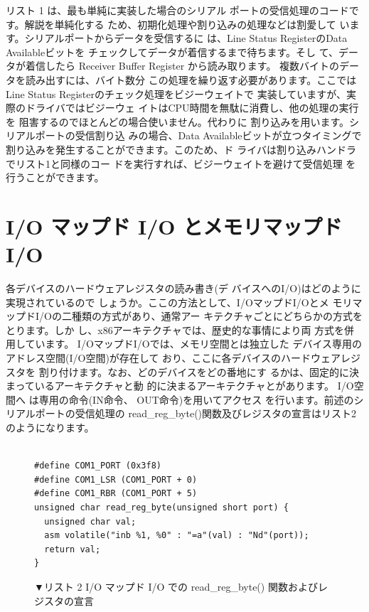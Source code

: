  リスト 1 は、最も単純に実装した場合のシリアル
ポートの受信処理のコードです。解説を単純化する
ため、初期化処理や割り込みの処理などは割愛して
います。シリアルポートからデータを受信するに
は、Line Status RegisterのData Availableビットを
チェックしてデータが着信するまで待ちます。そし
て、データが着信したら Receiver Buffer Register
から読み取ります。
 複数バイトのデータを読み出すには、バイト数分
この処理を繰り返す必要があります。ここではLine
Status Registerのチェック処理をビジーウェイトで
実装していますが、実際のドライバではビジーウェ
イトはCPU時間を無駄に消費し、他の処理の実行を
阻害するのでほとんどの場合使いません。代わりに
割り込みを用います。シリアルポートの受信割り込
みの場合、Data Availableビットが立つタイミングで
割り込みを発生することができます。このため、ド
ライバは割り込みハンドラでリスト1と同様のコー
ドを実行すれば、ビジーウェイトを避けて受信処理
を行うことができます。



\section{I/O マップド I/O とメモリマップド I/O}

 各デバイスのハードウェアレジスタの読み書き(デ
バイスへのI/O)はどのように実現されているので
しょうか。ここの方法として、I/OマップドI/Oとメ
モリマップドI/Oの二種類の方式があり、通常アー
キテクチャごとにどちらかの方式をとります。しか
し、x86アーキテクチャでは、歴史的な事情により両
方式を併用しています。
 I/OマップドI/Oでは、メモリ空間とは独立した
デバイス専用のアドレス空間(I/O空間)が存在して
おり、ここに各デバイスのハードウェアレジスタを
割り付けます。なお、どのデバイスをどの番地にす
るかは、固定的に決まっているアーキテクチャと動
的に決まるアーキテクチャとがあります。 I/O空間へ
は専用の命令(IN命令、 OUT命令)を用いてアクセス
を行います。前述のシリアルポートの受信処理の
read\_reg\_byte()関数及びレジスタの宣言はリスト2
のようになります。

\begin{figure}\centering
\begin{verbatim}

#define COM1_PORT (0x3f8)
#define COM1_LSR (COM1_PORT + 0)
#define COM1_RBR (COM1_PORT + 5)
unsigned char read_reg_byte(unsigned short port) {
  unsigned char val;
  asm volatile("inb %1, %0" : "=a"(val) : "Nd"(port));
  return val;
}
\end{verbatim}
\caption{▼リスト 2   I/O マップド I/O での read\_reg\_byte() 関数およびレジスタの宣言}
\end{figure}

